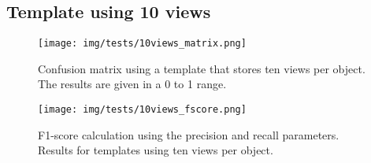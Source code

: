 \subsection{Template using 10 views}
	\begin{figure}[H]
		\begin{center}
	    \texttt{[image: img/tests/10views\_matrix.png]}
		\caption[Confusion matrix - templates using 10 views]{Confusion matrix using a template that stores ten views per object. The results are given in a 0 to 1 range. }
		\label{nodes}
		\end{center}
	\end{figure}

	\begin{figure}[H]
		\begin{center}
		\texttt{[image: img/tests/10views\_fscore.png]}
		\caption[F1-score - templates using 10 views]{F1-score calculation using the precision and recall parameters. Results for templates using ten views per object. }
		\label{nodes}
		\end{center}
	\end{figure}